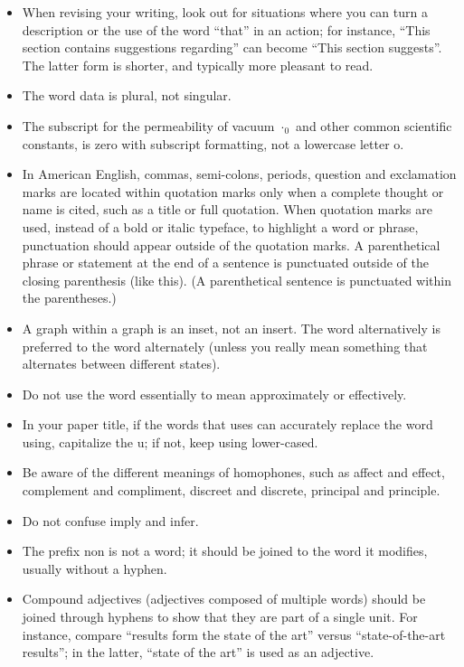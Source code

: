 \documentclass[letterpaper, 10 pt, conference]{ieeeconf}
\begin{document}
\begin{itemize}
\item When revising your writing, look out for situations where you can turn a description or the use of the word ``that'' in an action; for instance, ``This section contains suggestions regarding'' can become ``This section suggests''. %
  The latter form is shorter, and typically more pleasant to read.
\item The word data is plural, not singular.
\item The subscript for the permeability of vacuum $\cdot_0$ and other common scientific constants, is zero with subscript formatting, not a lowercase letter o.
\item In American English, commas, semi-colons, periods, question and exclamation marks are located within quotation marks only when a complete thought or name is cited, such as a title or full quotation. When quotation marks are used, instead of a bold or italic typeface, to highlight a word or phrase, punctuation should appear outside of the quotation marks. A parenthetical phrase or statement at the end of a sentence is punctuated outside of the closing parenthesis (like this). (A parenthetical sentence is punctuated within the parentheses.)
\item A graph within a graph is an inset, not an insert. The word alternatively is preferred to the word alternately (unless you really mean something that alternates between different states).
\item Do not use the word essentially to mean approximately or effectively.
\item In your paper title, if the words that uses can accurately replace the word using, capitalize the u; if not, keep using lower-cased.
\item Be aware of the different meanings of homophones, such as affect and effect, complement and compliment, discreet and discrete, principal and principle.
\item Do not confuse imply and infer.
\item The prefix non is not a word; it should be joined to the word it modifies, usually without a hyphen.
\item Compound adjectives (adjectives composed of multiple words) should be joined through hyphens to show that they are part of a single unit. For instance, compare ``results form the state of the art'' versus ``state-of-the-art results''; in the latter, ``state of the art'' is used as an adjective.

\end{itemize}
\end{document}
